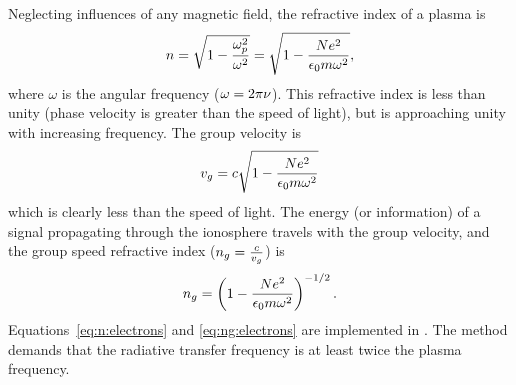 Neglecting influences of any magnetic field, the refractive index of a plasma
is \citep[e.g.][]{rybicki:radia:79}
\begin{equation}
\label{eq:n:electrons}
n =\sqrt{1-\frac{\omega_{p}^{2}}{\omega^{2}}}=\sqrt{1-\frac{Ne^{2}}
{\epsilon_{0}m\omega^{2}}},
\end{equation}
where $\omega$ is the angular frequency ($\omega=2\pi\nu$). This refractive
index is less than unity (phase velocity is greater than the speed of light),
but is approaching unity with increasing frequency. The group velocity is
\citep{rybicki:radia:79}
\begin{equation}
v_{g}=c\sqrt{1-\frac{Ne^{2}}
{\epsilon_{0}m\omega^{2}}}
\end{equation}
which is clearly less than the speed of light.
The energy (or information) of a signal propagating through the ionosphere
travels with the group velocity, and the group speed refractive
index (\(n_{g}=\frac{c}{v_{g}}\)) is
\begin{equation}
\label{eq:ng:electrons}
  n_{g}=\left(
    1-\frac{Ne^{2}}
    {\epsilon_{0}m\omega^{2}}
  \right)^{-1/2}.
\end{equation}
Equations~\ref{eq:n:electrons} and \ref{eq:ng:electrons} are implemented in
. The method demands that the
radiative transfer frequency is at least twice the plasma frequency.


